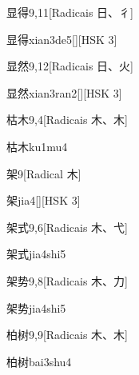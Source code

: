 \begin{entry}{显得}{9,11}[Radicais ⽇、⼻]
  \begin{phonetics}{显得}{xian3de5}[][HSK 3]
  \end{phonetics}
\end{entry}

\begin{entry}{显然}{9,12}[Radicais ⽇、⽕]
  \begin{phonetics}{显然}{xian3ran2}[][HSK 3]
  \end{phonetics}
\end{entry}

\begin{entry}{枯木}{9,4}[Radicais ⽊、⽊]
  \begin{phonetics}{枯木}{ku1mu4}
  \end{phonetics}
\end{entry}

\begin{entry}{架}{9}[Radical ⽊]
  \begin{phonetics}{架}{jia4}[][HSK 3]
  \end{phonetics}
\end{entry}

\begin{entry}{架式}{9,6}[Radicais ⽊、⼷]
  \begin{phonetics}{架式}{jia4shi5}
  \end{phonetics}
\end{entry}

\begin{entry}{架势}{9,8}[Radicais ⽊、⼒]
  \begin{phonetics}{架势}{jia4shi5}
  \end{phonetics}
\end{entry}

\begin{entry}{柏树}{9,9}[Radicais ⽊、⽊]
  \begin{phonetics}{柏树}{bai3shu4}
  \end{phonetics}
\end{entry}

